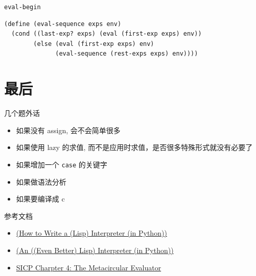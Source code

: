 \documentclass[presentation, bigger]{beamer}
\begin{document}
\begin{frame}[label={sec:org7677633},fragile]{\texttt{eval-begin}}
\begin{lstlisting}
(define (eval-sequence exps env)
  (cond ((last-exp? exps) (eval (first-exp exps) env))
        (else (eval (first-exp exps) env)
              (eval-sequence (rest-exps exps) env))))
\end{lstlisting}
\end{frame}

\section{最后}
\label{sec:orga1db18b}
\begin{frame}[label={sec:org79f2833},fragile]{几个题外话}
 \begin{itemize}
\item 如果没有 assign, 会不会简单很多
\item 如果使用 lazy 的求值, 而不是应用时求值，是否很多特殊形式就没有必要了
\item 如果增加一个 \texttt{case} 的关键字
\item 如果做语法分析
\item 如果要编译成 c
\end{itemize}
\end{frame}

\begin{frame}[label={sec:org1c7f2c5}]{参考文档}
\begin{itemize}
\item \href{http://norvig.com/lispy.html}{(How to Write a (Lisp) Interpreter (in Python))}
\item \href{http://norvig.com/lispy2.html}{(An ((Even Better) Lisp) Interpreter (in Python))}
\item \href{https://mitpress.mit.edu/sicp/full-text/book/book-Z-H-26.html\#\%\_sec\_4.1}{SICP Charpter 4: The Metacircular Evaluator}
\end{itemize}
\end{frame}
\end{document}
